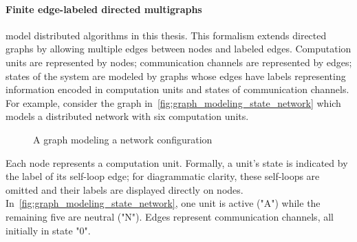 \paragraph{Finite edge-labeled directed multigraphs} model distributed algorithms in this thesis. This formalism extends directed graphs by allowing multiple edges between nodes and labeled edges. Computation units are represented by nodes; communication channels are represented by edges; states of the system are modeled by graphs whose edges have labels representing information encoded in computation units and states of communication channels. For example, consider the graph in~\autoref{fig:graph_modeling_state_network} which models a distributed network with six computation units.
 \begin{figure}[hbtp]
        \centering
    \caption{A graph modeling a network configuration}
    \label{fig:graph_modeling_state_network}
\end{figure}
Each node represents a computation unit.
Formally, a unit's state is indicated by the label of its self-loop edge; for diagrammatic clarity, these self-loops are omitted and their labels are displayed directly on nodes.  
 In~\autoref{fig:graph_modeling_state_network}, one unit is active ("A") while the remaining five are neutral ("N"). Edges represent communication channels, all initially in state "0".

